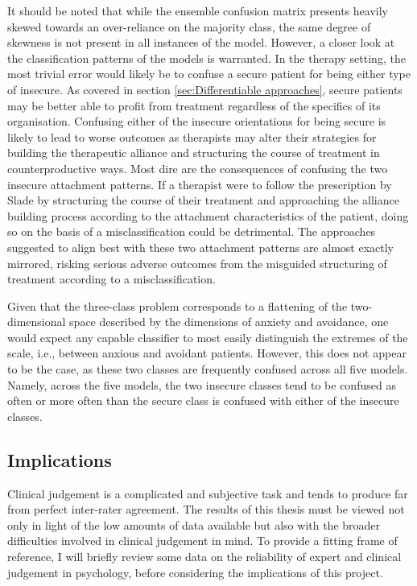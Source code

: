 \documentclass[12pt]{report}
\begin{document}
It should be noted that while the ensemble confusion matrix presents heavily skewed towards an over-reliance on the majority class, the same degree of skewness is not present in all instances of the model.
However, a closer look at the classification patterns of the models is warranted.
In the therapy setting, the most trivial error would likely be to confuse a secure patient for being either type of insecure.
As covered in section \ref{sec:Differentiable approaches}, secure patients may be better able to profit from treatment regardless of the specifics of its organisation.
Confusing either of the insecure orientations for being secure is likely to lead to worse outcomes as therapists may alter their strategies for building the therapeutic alliance and structuring the course of treatment in counterproductive ways.
Most dire are the consequences of confusing the two insecure attachment patterns.
If a therapist were to follow the prescription by Slade \citeyear{Slade2016} by structuring the course of their treatment and approaching the alliance building process according to the attachment characteristics of the patient, doing so on the basis of a misclassification could be detrimental.
The approaches suggested to align best with these two attachment patterns are almost exactly mirrored, risking serious adverse outcomes from the misguided structuring of treatment according to a misclassification.

Given that the three-class problem corresponds to a flattening of the two-dimensional space described by the dimensions of anxiety and avoidance, one would expect any capable classifier to most easily distinguish the extremes of the scale, i.e., between anxious and avoidant patients.
However, this does not appear to be the case, as these two classes are frequently confused across all five models.
Namely, across the five models, the two insecure classes tend to be confused as often or more often than the secure class is confused with either of the insecure classes.



\subsection{Implications}
Clinical judgement is a complicated and subjective task and tends to produce far from perfect inter-rater agreement.
The results of this thesis must be viewed not only in light of the low amounts of data available but also with the broader difficulties involved in clinical judgement in mind.
To provide a fitting frame of reference, I will briefly review some data on the reliability of expert and clinical judgement in psychology, before considering the implications of this project.
\end{document}
